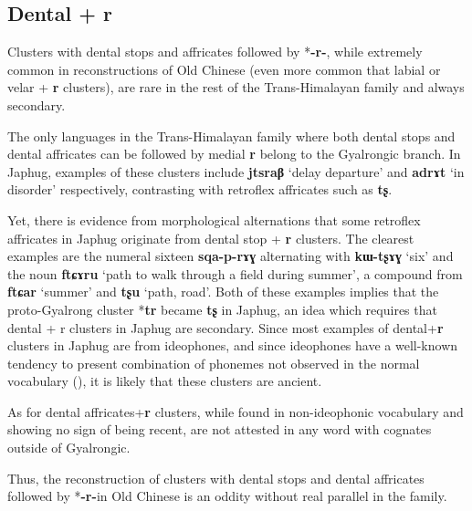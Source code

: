 \documentclass[oneside,a4paper,11pt]{article}
\newcommand{\ipa}[1]{{\phon\mbox{\textbf{#1}}}}
\begin{document}
\subsection{Dental + r}
Clusters with dental stops and affricates followed by *\ipa{-r-}, while extremely common in reconstructions of Old Chinese (even more common that labial or velar + \ipa{r} clusters), are rare in the rest of the Trans-Himalayan family and always secondary.


The only languages in the Trans-Himalayan family where both dental stops and dental affricates can be followed by medial \ipa{r} belong to the Gyalrongic branch. In Japhug, examples of these clusters include \ipa{jtsraβ} `delay departure' and \ipa{adrɤt} `in disorder' respectively, contrasting with retroflex affricates such as \ipa{tʂ}.

Yet, there is evidence from morphological alternations that some retroflex affricates in Japhug originate from dental stop + \ipa{r} clusters. The clearest examples are the numeral sixteen \ipa{sqa-p-rɤɣ} alternating with \ipa{kɯ-tʂɤɣ} `six' and the noun \ipa{ftɕɤru} `path to walk through a field during summer', a compound from \ipa{ftɕar} `summer' and \ipa{tʂu} `path, road'. Both of these examples implies that the proto-Gyalrong cluster *\ipa{tr} became \ipa{tʂ} in Japhug, an idea which requires that dental + r clusters in Japhug are secondary. Since most examples of dental+\ipa{r} clusters in Japhug are from ideophones, and since ideophones have a well-known tendency to present combination of phonemes not observed in the normal vocabulary (\citealt{japhug14ideophones}), it is likely that these clusters are ancient.

As for dental affricates+\ipa{r} clusters, while found in non-ideophonic vocabulary and showing no sign of being recent, are not attested in any word with cognates outside of Gyalrongic. 


Thus, the reconstruction of clusters with dental stops and dental affricates followed by *\ipa{-r-}in Old Chinese is an oddity without real parallel in the family.
%
\end{document}
